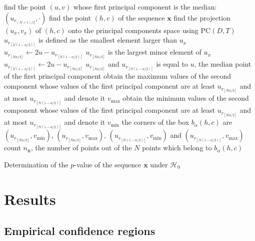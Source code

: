 \documentclass[alpha-refs]{wiley-article}
\begin{document}
\begin{algorithm}[hbt]
find the point $(u,v)$ whose first principal component is the median: $(u_{r_{(N+1)/2}}, \cdot)$\;
find the point $(h,c)$ of the sequence $\bm x$\;
find the projection $(u_x,v_x)$ of $(h,c)$ onto the principal components space using $\text{PC}(D,T)$\;	
{ $u_{r_{[N(1-\alpha/2)]}}$ is defined as the smallest element larger than $u_x$\;
	$u_{r_{[N\alpha/2]}} \leftarrow 2u - u_{r_{[N(1-\alpha/2)]}}$\;
}
{
	{ $u_{r_{[N\alpha/2]}}$ is the largest minor element of $u_x$\;
		$u_{r_{[N(1-\alpha/2)]}} \leftarrow 2u - u_{r_{[N\alpha/2]}}$\;
	}
	{ $u_{r_{[N\alpha/2]}}$ and $u_{r_{[N(1-\alpha/2)]}}$ is equal to $u$, the median point of the first principal component\; 
	}
}
obtain the maximum values of the second component whose values of the first principal component are at least $u_{r_{[N\alpha/2]}}$ and at most $u_{r_{[N(1-\alpha/2)]}}$ and denote it $v_{\max}$\;
obtain the minimum values of the second component whose values of the first principal component are at least $u_{r_{[N\alpha/2]}}$ and at most $u_{r_{[N(1-\alpha/2)]}}$ and denote it $v_{\min}$\;
the corners of the box $b_{\alpha}(h,c)$ are 
$(u_{r_{[N\alpha/2]}}, v_{\min})$, 
$(u_{r_{[N\alpha/2]}}, v_{\max})$, 
$(u_{r_{[N(1-\alpha/2)]}}, v_{\min})$ and 
$(u_{r_{[N(1-\alpha/2)]}}, v_{\max})$\;
count $n_{\bm x}$, the number of points out of the $N$ points which belong to $b_{\alpha}(h,c)$\;
\caption{Determination of the $p$-value of the sequence $\bm x$ under $\mathcal H_0$}\label{Algo:p-value}
\end{algorithm}

\section{Results}\label{Sec:Results}

\subsection{Empirical confidence regions}
\end{document}
